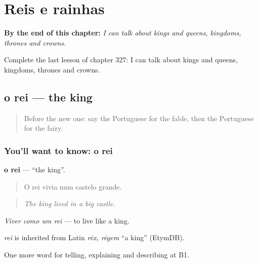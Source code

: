 
\chapter{Reis e rainhas}
\label{ch:pt-reis-e-rainhas}

\begin{chapteropening}
\textbf{By the end of this chapter:} \emph{I can talk about kings and queens, kingdoms, thrones and crowns.}

Complete the last lesson of chapter 327: I can talk about kings and queens, kingdoms, thrones and crowns.
\end{chapteropening}

\section[o rei]{o rei — the king}

\label{lesson:PT-C327-rei}



\begin{quote}
Before the new one: say the Portuguese for the fable, then the Portuguese for the fairy.
\end{quote}

\subsection*{You'll want to know: o rei}
\textbf{o rei} — \textquotedblleft{}the king\textquotedblright{}.

\begin{quote}
O rei vivia num castelo grande.
\end{quote}

\begin{quote}
\emph{The king lived in a big castle.}
\end{quote}

\emph{Viver como um rei} — to live like a king.

\begin{cousinweb}
\emph{rei} is inherited from Latin \emph{rēx, rēgem} \textquotedblleft{}a king\textquotedblright{} (EtymDB).
\end{cousinweb}

\begin{grammarlens}[title={What you've built}]
One more word for telling, explaining and describing at B1.
\end{grammarlens}

